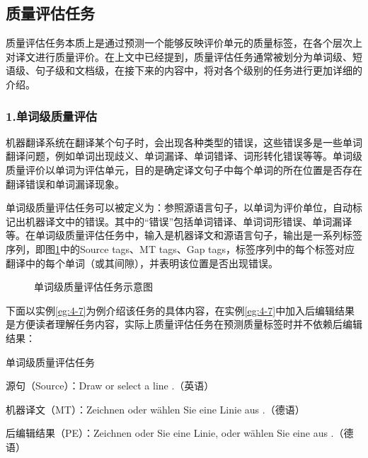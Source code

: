 
\subsection{质量评估任务}

\parinterval 质量评估任务本质上是通过预测一个能够反映评价单元的质量标签，在各个层次上对译文进行质量评价。在上文中已经提到，质量评估任务通常被划分为单词级、短语级、句子级和文档级，在接下来的内容中，将对各个级别的任务进行更加详细的介绍。


\subsubsection{1.单词级质量评估}

\parinterval 机器翻译系统在翻译某个句子时，会出现各种类型的错误，这些错误多是一些单词翻译问题，例如单词出现歧义、单词漏译、单词错译、词形转化错误等等。单词级质量评价以单词为评估单元，目的是确定译文句子中每个单词的所在位置是否存在翻译错误和单词漏译现象。

\parinterval 单词级质量评估任务可以被定义为：参照源语言句子，以单词为评价单位，自动标记出机器译文中的错误。其中的“错误”包括单词错译、单词词形错误、单词漏译等。在单词级质量评估任务中，输入是机器译文和源语言句子，输出是一系列标签序列，即图\ref{fig:4-11}中的Source tags、MT tags、Gap tags，标签序列中的每个标签对应翻译中的每个单词（或其间隙），并表明该位置是否出现错误。

\begin{figure}[htp]
    \centering
	
   \caption{单词级质量评估任务示意图}
   \label{fig:4-11}
\end{figure}

\parinterval 下面以实例\ref{eg:4-7}为例介绍该任务的具体内容，在实例\ref{eg:4-7}中加入后编辑结果是方便读者理解任务内容，实际上质量评估任务在预测质量标签时并不依赖后编辑结果：

\begin{example}
单词级质量评估任务

源句（Source）：Draw or select a line .（英语）

机器译文（MT）：Zeichnen oder wählen Sie eine Linie aus .（德语）

后编辑结果（PE）：Zeichnen oder Sie eine Linie, oder wählen Sie eine aus .（德语）

\label{eg:4-7}
\end{example}

